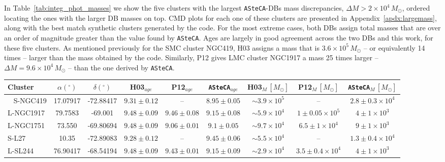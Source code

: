 \documentclass[draft]{aa}
\begin{document}
%
In Table~\ref{tab:integ_phot_masses} we show the five clusters with the largest
\texttt{ASteCA}-DBs mass discrepancies, $\Delta M{>}2{\times}10^4\,M_{\odot}$,
ordered locating the ones with the larger DB masses on top.
CMD plots for each one of these clusters are presented in
Appendix~\ref{apdx:largemass}, along with the best match synthetic clusters
generated by the code.
For the most extreme cases, both DBs assign total masses that are over an order
of magnitude greater than the value found by \texttt{ASteCA}.
Ages are largely in good agreement across the two DBs and this work, for these
five clusters.
As mentioned previously for the SMC cluster NGC419, H03 assigns a mass that is
$3.6{\times}10^5\,M_{\odot}$ -- or equivalently 14 times -- larger than the mass
obtained by the code. Similarly, P12 gives LMC cluster NGC1917 a mass 25
times larger -- $\Delta M{=}9.6{\times}10^4\,M_{\odot}$ -- than the one
derived by \texttt{ASteCA}.

%
\begin{table*}
\centering
\caption{Clusters with large differences ($\Delta M{>}20000\,M_{\odot}$) in
their assigned \texttt{ASteCA} masses, versus the values found in the DBs.
Equatorial coordinates are expressed in degrees for the $J2000.0$ epoch.
Ages are given as $\log(age/yr)$.}
\label{tab:integ_phot_masses}
\begin{tabular}{lcccccccc}
\hline\hline
Cluster & $\alpha(^\circ)$ & $\delta(^\circ)$ & H03$_{age}$ &
P12$_{age}$ & \texttt{ASteCA}$_{age}$ &
H03$_{M}\,[M_{\odot}]$ &
P12$_{M}\,[M_{\odot}]$ & \texttt{ASteCA}$_{M}\,[M_{\odot}]$\\
\hline\
%
S-NGC419 & 17.07917 & -72.88417 & $9.31{\pm}0.12$ & -- & $8.95{\pm}0.05$ &
$\sim3.9{\times}10^{5}$ & -- & $2.8{\pm}0.3{\times}10^{4}$\\
%
L-NGC1917 & 79.7583 & -69.001 & $9.48{\pm}0.09$ & $9.46{\pm}0.08$ & $9.15{\pm}0.08$ &
$\sim5.9{\times}10^{4}$ & $1{\pm}0.05{\times}10^{5}$ & $4{\pm}1{\times}10^{3}$\\
%
L-NGC1751 & 73.550 & -69.80694 & $9.48{\pm}0.09$ & $9.06{\pm}0.01$ & $9.1{\pm}0.05$ &
$\sim9.7{\times}10^{4}$ & $6.5{\pm}1{\times}10^{4}$ & $9{\pm}1{\times}10^{3}$\\
%
S-L27 & 10.35 & -72.89083 & $9.28{\pm}0.12$ & -- & $9.45{\pm}0.06$ &
$\sim5.5{\times}10^{4}$ & -- & $1.3{\pm}0.4{\times}10^{4}$\\
%
L-SL244 & 76.90417 & -68.54194 & $9.48{\pm}0.09$ & $9.43{\pm}0.01$ & $9.15{\pm}0.09$ &
$\sim2.9{\times}10^{4}$ & $3.5{\pm}0.4{\times}10^{4}$ & $4{\pm}1{\times}10^{3}$\\
\hline   
\end{tabular}
\end{table*}
\end{document}
